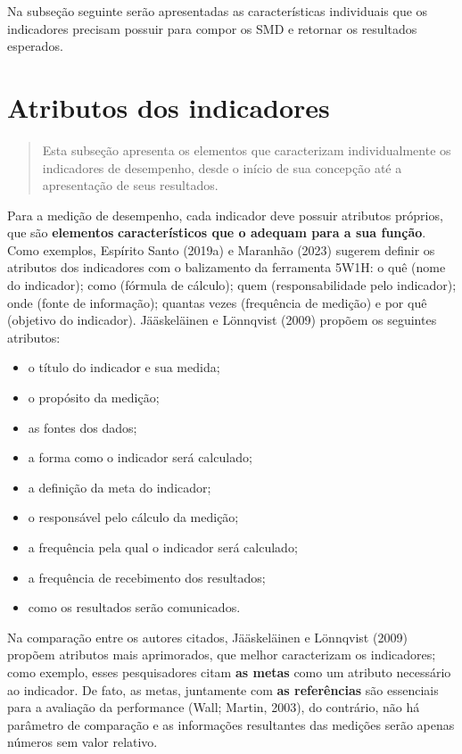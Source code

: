 \documentclass[
  letterpaper,
  DIV=11,
  numbers=noendperiod]{scrreprt}
\begin{document}
Na subseção seguinte serão apresentadas as características individuais
que os indicadores precisam possuir para compor os SMD e retornar os
resultados esperados.

\hypertarget{atributos-dos-indicadores}{%
\chapter{Atributos dos indicadores}\label{atributos-dos-indicadores}}

\begin{quote}
Esta subseção apresenta os elementos que caracterizam individualmente os
indicadores de desempenho, desde o início de sua concepção até a
apresentação de seus resultados.
\end{quote}

Para a medição de desempenho, cada indicador deve possuir atributos
próprios, que são \textbf{elementos} \textbf{característicos que o
adequam para a sua função}. Como exemplos, Espírito Santo (2019a) e
Maranhão (2023) sugerem definir os atributos dos indicadores com o
balizamento da ferramenta 5W1H: o quê (nome do indicador); como (fórmula
de cálculo); quem (responsabilidade pelo indicador); onde (fonte de
informação); quantas vezes (frequência de medição) e por quê (objetivo
do indicador). Jääskeläinen e Lönnqvist (2009) propõem os seguintes
atributos:

\begin{itemize}
\item
  o título do indicador e sua medida;
\item
  o propósito da medição;
\item
  as fontes dos dados;
\item
  a forma como o indicador será calculado;
\item
  a definição da meta do indicador;
\item
  o responsável pelo cálculo da medição;
\item
  a frequência pela qual o indicador será calculado;
\item
  a frequência de recebimento dos resultados;
\item
  como os resultados serão comunicados.
\end{itemize}

Na comparação entre os autores citados, Jääskeläinen e Lönnqvist (2009)
propõem atributos mais aprimorados, que melhor caracterizam os
indicadores; como exemplo, esses pesquisadores citam \textbf{as metas}
como um atributo necessário ao indicador. De fato, as metas, juntamente
com \textbf{as referências} são essenciais para a avaliação da
performance (Wall; Martin, 2003), do contrário, não há parâmetro de
comparação e as informações resultantes das medições serão apenas
números sem valor relativo.
\end{document}
